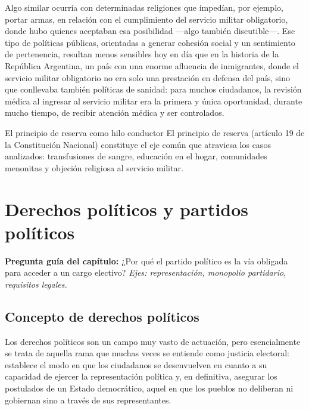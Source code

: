 \documentclass[12pt,oneside]{book}
\begin{document}
Algo similar ocurría con determinadas religiones que impedían, por ejemplo, portar armas, en relación con el cumplimiento del servicio militar obligatorio, donde hubo quienes aceptaban esa posibilidad —algo también discutible—. Ese tipo de políticas públicas, orientadas a generar cohesión social y un sentimiento de pertenencia, resultan menos sensibles hoy en día que en la historia de la República Argentina, un país con una enorme afluencia de inmigrantes, donde el servicio militar obligatorio no era solo una prestación en defensa del país, sino que conllevaba también políticas de sanidad: para muchos ciudadanos, la revisión médica al ingresar al servicio militar era la primera y única oportunidad, durante mucho tiempo, de recibir atención médica y ser controlados.

\begin{definition}{El principio de reserva como hilo conductor}
El principio de reserva (artículo 19 de la Constitución Nacional) constituye el eje común que atraviesa los casos analizados: transfusiones de sangre, educación en el hogar, comunidades menonitas y objeción religiosa al servicio militar.
\end{definition}

\chapter{Derechos políticos y partidos políticos}

\begin{note}
\textbf{Pregunta guía del capítulo:} ¿Por qué el partido político es la vía obligada para acceder a un cargo electivo? \textit{Ejes: representación, monopolio partidario, requisitos legales.}
\end{note}

\section{Concepto de derechos políticos}

Los derechos políticos son un campo muy vasto de actuación, pero esencialmente se trata de aquella rama que muchas veces se entiende como justicia electoral: establece el modo en que los ciudadanos se desenvuelven en cuanto a su capacidad de ejercer la representación política y, en definitiva, asegurar los postulados de un Estado democrático, aquel en que los pueblos no deliberan ni gobiernan sino a través de sus representantes.
\end{document}
